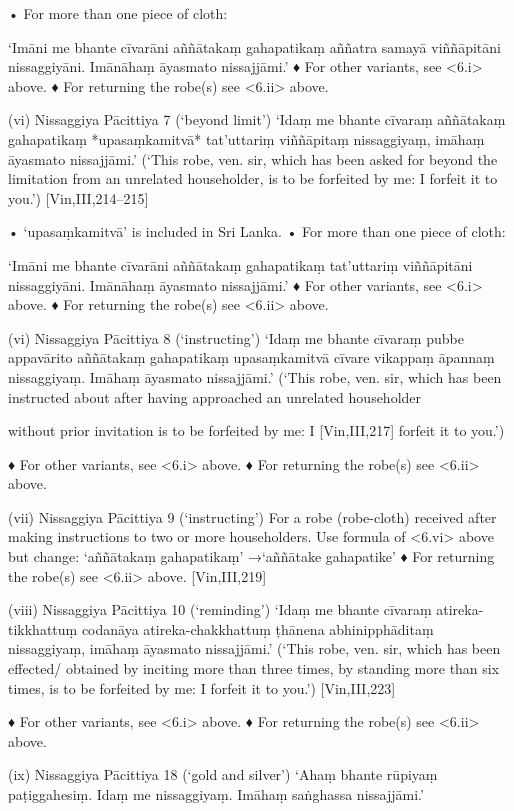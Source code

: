 • For more than one piece of cloth:

‘Imāni me bhante cīvarāni aññātakaṃ
gahapatikaṃ aññatra samayā viññāpitāni
nissaggiyāni. Imānāhaṃ āyasmato nissajjāmi.’
♦ For other variants, see <6.i> above.
♦ For returning the robe(s) see <6.ii> above.

(vi) Nissaggiya Pācittiya 7 (‘beyond limit’)
‘Idaṃ me bhante cīvaraṃ aññātakaṃ
gahapatikaṃ *upasaṃkamitvā* tat’uttariṃ
viññāpitaṃ nissaggiyaṃ,
imāhaṃ āyasmato nissajjāmi.’
(‘This robe, ven. sir, which has been asked for beyond
the limitation from an unrelated householder, is to be
forfeited by me: I forfeit it to you.’)
[Vin,III,214–215]

• ‘upasaṃkamitvā’ is included in Sri Lanka.
• For more than one piece of cloth:

‘Imāni me bhante cīvarāni aññātakaṃ
gahapatikaṃ tat’uttariṃ viññāpitāni
nissaggiyāni. Imānāhaṃ āyasmato nissajjāmi.’
♦ For other variants, see <6.i> above.
♦ For returning the robe(s) see <6.ii> above.

(vi) Nissaggiya Pācittiya 8 (‘instructing’)
‘Idaṃ me bhante cīvaraṃ pubbe appavārito
aññātakaṃ gahapatikaṃ upasaṃkamitvā
cīvare vikappaṃ āpannaṃ nissaggiyaṃ.
Imāhaṃ āyasmato nissajjāmi.’
(‘This robe, ven. sir, which has been instructed about
after having approached an unrelated householder

without prior invitation is to be forfeited by me: I
[Vin,III,217]
forfeit it to you.’)

♦ For other variants, see <6.i> above.
♦ For returning the robe(s) see <6.ii> above.

(vii) Nissaggiya Pācittiya 9 (‘instructing’)
For a robe (robe-cloth) received after making
instructions to two or more householders. Use
formula of <6.vi> above but change:
‘aññātakaṃ gahapatikaṃ’
→‘aññātake gahapatike’
♦ For returning the robe(s) see <6.ii> above.
[Vin,III,219]

(viii) Nissaggiya Pācittiya 10 (‘reminding’)
‘Idaṃ me bhante cīvaraṃ atireka-tikkhattuṃ
codanāya atireka-chakkhattuṃ ṭhānena
abhinipphāditaṃ nissaggiyaṃ,
imāhaṃ āyasmato nissajjāmi.’
(‘This robe, ven. sir, which has been effected/
obtained by inciting more than three times, by
standing more than six times, is to be forfeited
by me: I forfeit it to you.’)
[Vin,III,223]

♦ For other variants, see <6.i> above.
♦ For returning the robe(s) see <6.ii> above.

(ix) Nissaggiya Pācittiya 18 (‘gold and silver’)
‘Ahaṃ bhante rūpiyaṃ paṭiggahesiṃ.
Idaṃ me nissaggiyaṃ.
Imāhaṃ saṅghassa nissajjāmi.’

